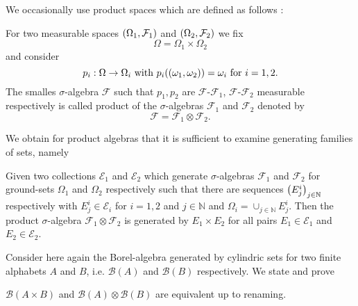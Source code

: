We occasionally use product spaces which are defined as follows 
\cite[Chapter 22]{Bauer}:
\begin{definition}
  For two measurable spaces $\left(\Omega_{1}, \mathcal{F}_{1}\right)$ and 
  $\left(\Omega_{2}, \mathcal{F}_{2}\right)$ we fix
  \begin{equation*}
    \Omega = \Omega_{1}\times\Omega_{2}
  \end{equation*}
  and consider
  \begin{equation*}
    p_{i}:\Omega\rightarrow\Omega_{i}\text{ with }
      p_{i}(\left(\omega_{1}, \omega_{2}\right)) = \omega_{i}\text{ for }i = 1,2.
  \end{equation*}
  The smalles $\sigma$-algebra $\mathcal{F}$ such that $p_{1}, p_{2}$ are 
  $\mathcal{F}$-$\mathcal{F}_{1}$, $\mathcal{F}$-$\mathcal{F}_{2}$ measurable 
  respectively is called product of the $\sigma$-algebras $\mathcal{F}_{1}$ and
  $\mathcal{F}_{2}$ denoted by
  \begin{equation*}
    \mathcal{F} = \mathcal{F}_{1}\otimes\mathcal{F}_{2}.
  \end{equation*}
\end{definition}
We obtain for product algebras that it is sufficient to examine generating
families of sets, namely
\begin{theorem}
  \cite[Theorem 22.1]{Bauer}
  Given two collections $\mathcal{E}_{1}$ and $\mathcal{E}_{2}$ which 
  generate $\sigma$-algebras $\mathcal{F}_{1}$ and $\mathcal{F}_{2}$ for 
  ground-sets $\Omega_{1}$ and $\Omega_{2}$ respectively such that there are
  sequences $\left(E^{i}_{j}\right)_{j\in\mathbb{N}}$ respectively with 
  $E^{i}_{j}\in\mathcal{E}_{i}$ for $i = 1,2$ and $j\in\mathbb{N}$ and 
  $\Omega_{i} = \cup_{j\in\mathbb{N}}E_{j}^{i}$. Then the product 
  $\sigma$-algebra $\mathcal{F}_{1}\otimes\mathcal{F}_{2}$ is generated by 
  $E_{1}\times E_{2}$ for all pairs $E_{1}\in\mathcal{E}_{1}$ and 
  $E_{2}\in\mathcal{E}_{2}$. 
  \label{thm:productgen}
\end{theorem}
Consider here again the Borel-algebra generated by cylindric sets for two 
finite alphabets $A$ and $B$, i.e. $\mathcal{B}(A)$ and $\mathcal{B}(B)$ 
respectively. We state and prove
\begin{lemma}
  $\mathcal{B}(A\times B)$ and $\mathcal{B}(A)\otimes\mathcal{B}(B)$ are 
  equivalent up to renaming.
  \label{lem:borelinterleaving}
\end{lemma}
